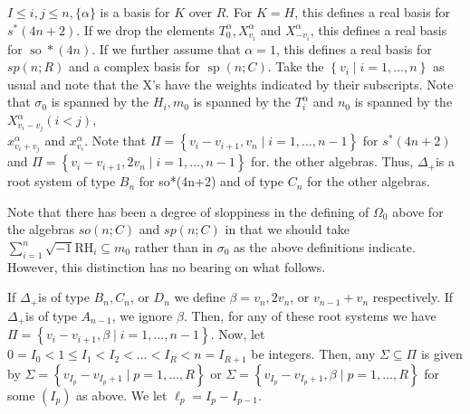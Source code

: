 \documentclass[10pt]{article}
\begin{document}
$I \leq i, j \leq n,\{\alpha\}$ is a basis for $K$ over $R$. For $K=H$, this defines a real basis for $s^{*}(4 n+2)$. If we drop the elements $T_{0}^{\alpha}, X_{v_{i}}^{\alpha}$ and $X_{-v_{i}}^{\alpha}$, this defines a real basis for $\operatorname{so} *(4 n)$. If we further assume that $\alpha=1$, this defines a real basis for $s p(n ; R)$ and a complex basis for $\operatorname{sp}(n ; C)$. Take the $\left\{v_{i} \mid i=1, \ldots, n\right\}$ as usual and note that the X's have the weights indicated by their subscripts. Note that $\sigma_{0}$ is spanned by the $H_{i}, m_{0}$ is spanned by the $T_{i}^{\alpha}$ and $n_{0}$ is spanned by the $X_{v_{i}-v_{j}}^{\alpha}(i<j)$,\\
$x_{v_{i}+v_{j}}^{\alpha}$ and $x_{v_{i}}^{\alpha}$. Note that $\Pi=\left\{v_{i}-v_{i+1}, v_{n} \mid i=1, \ldots, n-1\right\}$ for $s^{*}(4 n+2)$ and $\Pi=\left\{v_{i}-v_{i+1}, 2 v_{n} \mid i=1, \ldots, n-1\right\}$ for. the other algebras. Thus, $\Delta_{+}$is a root system of type $B_{n}$ for so*(4n+2) and of type $C_{n}$ for the other algebras.

Note that there has been a degree of sloppiness in the defining of $\Omega_{0}$ above for the algebras $s o(n ; C)$ and $s p(n ; C)$ in that we should take $\sum_{i=1}^{n} \sqrt{-1} \mathrm{RH}_{i} \subseteq m_{0}$ rather than in $\sigma_{0}$ as the above definitions indicate. However, this distinction has no bearing on what follows.

If $\Delta_{+}$is of type $B_{n}, C_{n}$, or $D_{n}$ we define $\beta=v_{n}, 2 v_{n}$, or $v_{n-1}+v_{n}$ respectively. If $\Delta_{+}$is of type $A_{n-1}$, we ignore $\beta$. Then, for any of these root systems we have $\Pi=\left\{v_{i}-v_{i+1}, \beta \mid i=1, \ldots, n-1\right\}$. Now, let $0=I_{0}<1 \leq I_{1}<I_{2}<\ldots<I_{R}<n=I_{R+1}$ be integers. Then, any $\Sigma \subseteq \Pi$ is given by $\Sigma=\left\{v_{I_{p}}-v_{I_{p}+1} \mid p=1, \ldots, R\right\}$ or $\Sigma=\left\{v_{I_{p}}-v_{I_{p}+1}, \beta \mid p=1, \ldots, R\right\}$ for some $\left(I_{p}\right)$ as above. We let $\ell_{p}=I_{p}-I_{p-1}$.
\end{document}
